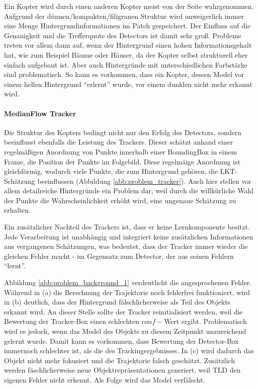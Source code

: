 	Ein Kopter wird durch einen anderen Kopter meist von der Seite wahrgenommen. Aufgrund der dünnen/kompakten/filigranen Struktur wird unweigerlich immer eine Menge Hintergrundinformationen im Patch gespeichert. Der Einfluss auf die Genauigkeit und die Trefferquote des Detectors ist damit sehr groß. Probleme treten vor allem dann auf, wenn der Hintergrund einen hohen Informationsgehalt hat, wie zum Beispiel Bäume oder Häuser, da der Kopter selbst strukturell eher einfach aufgebaut ist. Aber auch Hintergründe mit unterschiedlichen Farbstärke sind problematisch. So kann es vorkommen, dass ein Kopter, dessen Model vor einem hellen Hintergrund ``erlernt'' wurde, vor einem dunklen nicht mehr erkannt wird.


	\paragraph{MedianFlow Tracker}
	Die Struktur des Kopters bedingt nicht nur den Erfolg des Detectors, sondern beeinflusst ebenfalls die Leistung des Trackers. Dieser schätzt anhand einer regelmäßigen Anordnung von Punkte innerhalb einer BoundingBox in einem Frame, die Position der Punkte im Folgebild. Diese regelmäige Anordnung ist gleichförmig, wodurch viele Punkte, die zum Hintergrund gehören, die LKT-Schätzung beeinflussen (Abbildung \ref{abb:problem_tracker}). Auch hier stellen vor allem detailreiche Hintergründe ein Problem dar, weil durch die willkürliche Wahl der Punkte die Wahrscheinlichkeit erhöht wird, eine ungenaue Schätzung zu erhalten.

	Ein zusätzlicher Nachteil des Trackers ist, dass er keine Lernkomponente besitzt. Jede Verarbeitung ist unabhängig und integriert keine zusätzlichen Informationen aus vergangenen Schätzungen, was bedeutet, dass der Tracker immer wieder die gleichen Fehler macht - im Gegensatz zum Detector, der aus seinen Fehlern ``lernt''.

	Abbildung \ref{abb:problem_background_1} verdeutlicht die angesprochenen Fehler. Während in (a) die Berechnung der Trajektorie noch fehlerfrei funktioniert, wird in (b) deutlich, dass der Hintergrund fälschlicherweise als Teil des Objekts erkannt wird. An dieser Stelle sollte der Tracker reinitialisiert werden, weil die Bewertung der Tracker-Box einen schlechten $conf-$Wert ergibt. Problematisch wird es jedoch, wenn das Model des Objekts zu diesem Zeitpunkt unzureichend gelernt wurde. Damit kann es vorkommen, dass Bewertung der Detector-Box immernoch schlechter ist, als die des Trackingergebnisses. In (c) wird dadurch das Objekt nicht mehr fokusiert und die Trajektorie falsch geschätzt. Zusätzlich werden fäschlicherweise neue Objektrepräsentationen generiert, weil TLD den eigenen Fehler nicht erkennt. Als Folge wird das Model verfälscht.

